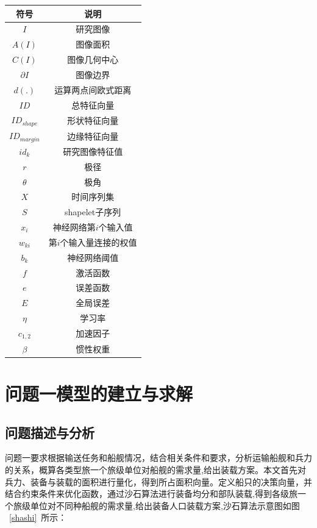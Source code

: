 \documentclass{whutmod}
\begin{document}
	\begin{table}[H]
	\label{biao} \centering
		\begin{tabular}{cc}
			\toprule[1.5pt]
			\multicolumn{1}{m{5cm}}{\centering 符号} & \multicolumn{1}{m{5cm}}{\centering 说明} \\
			\midrule[1pt]
			$I$  &  研究图像 \\ 
			$A(I)$  &  图像面积 \\ 
			$C(I)$  & 图像几何中心\\
			$\partial I$  &  图像边界 \\ 
		    $d(.)$ & 运算两点间欧式距离\\
			$ID$	 &  总特征向量  \\ 
			$ID_{shape}$ &  形状特征向量 \\ 
			$ID_{margin}$	 &  边缘特征向量 \\ 
			$id_{k}$  &   研究图像特征值\\ 
			$r$  &  极径\\	
			$\theta$ & 极角\\
			$X$ &  时间序列集\\ 
			$S$ & shapelet子序列\\
			$x_{i}$ & 神经网络第$i$个输入值\\
			$w_{ki}$ & 第$i$个输入量连接的权值\\
			$b_{k}$ & 神经网络阈值\\
			$f$  & 激活函数\\
			$e$ & 误差函数\\
			$E$ & 全局误差\\
			$\eta $ &  学习率\\
			$c_{1,2}$ & 加速因子\\
			$\beta$ & 惯性权重\\
			

		
			\bottomrule[1.5pt]
		\end{tabular}
	\end{table}

	\section{问题一模型的建立与求解}
    \subsection{问题描述与分析}
    问题一要求根据输送任务和船舰情况，结合相关条件和要求，分析运输船舰和兵力的关系，概算各类型旅一个旅级单位对船舰的需求量,给出装载方案。本文首先对兵力、装备与装载的面积进行量化，得到所占面积向量。定义船只的决策向量，并结合约束条件来优化函数，通过沙石算法进行装备均分和部队装载,得到各级旅一个旅级单位对不同种船舰的需求量,给出装备人口装载方案,沙石算法示意图如图 ~\ref{shashi}~所示：
	   
\end{document}
